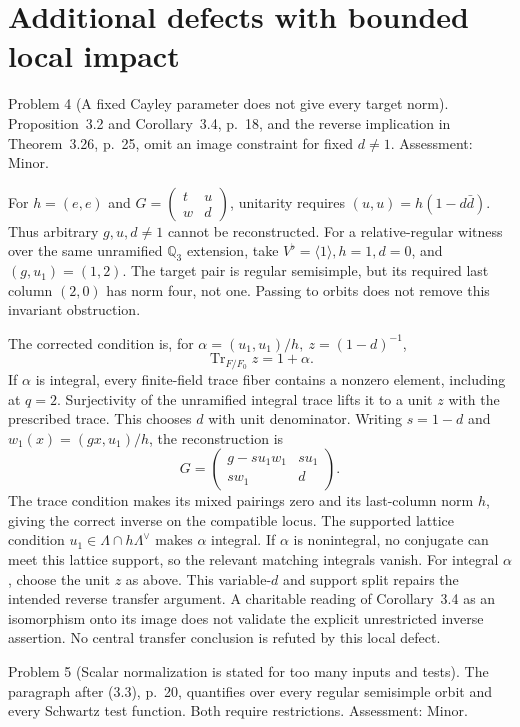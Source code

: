 \documentclass[10pt]{article}
\begin{document}
\section*{Additional defects with bounded local impact}
Problem 4 (A fixed Cayley parameter does not give every target norm).  Proposition 3.2 and Corollary 3.4, p. 18, and the reverse implication in Theorem 3.26, p. 25, omit an image constraint for fixed \(d\ne1\). Assessment: Minor.\par
For \(h=(e,e)\) and \(G=\left(\begin{smallmatrix}t&u\\w&d\end{smallmatrix}\right)\), unitarity requires \((u,u)=h(1-d\bar d)\). Thus arbitrary \(g,u,d\ne1\) cannot be reconstructed. For a relative-regular witness over the same unramified \(\mathbb Q_3\) extension, take \(V^\flat=\langle1\rangle,h=1,d=0\), and \((g,u_1)=(1,2)\). The target pair is regular semisimple, but its required last column \((2,0)\) has norm four, not one. Passing to orbits does not remove this invariant obstruction.\par
The corrected condition is, for \(\alpha=(u_1,u_1)/h,\ z=(1-d)^{-1}\), \[\operatorname{Tr}_{F/F_0}z=1+\alpha.\] If \(\alpha\) is integral, every finite-field trace fiber contains a nonzero element, including at \(q=2\). Surjectivity of the unramified integral trace lifts it to a unit \(z\) with the prescribed trace. This chooses \(d\) with unit denominator. Writing \(s=1-d\) and \(w_1(x)=(gx,u_1)/h\), the reconstruction is \[G=\begin{pmatrix}g-su_1w_1&su_1\\sw_1&d\end{pmatrix}.\] The trace condition makes its mixed pairings zero and its last-column norm \(h\), giving the correct inverse on the compatible locus. The supported lattice condition \(u_1\in\Lambda\cap h\Lambda^\vee\) makes \(\alpha\) integral. If \(\alpha\) is nonintegral, no conjugate can meet this lattice support, so the relevant matching integrals vanish. For integral \(\alpha\), choose the unit \(z\) as above. This variable-\(d\) and support split repairs the intended reverse transfer argument. A charitable reading of Corollary 3.4 as an isomorphism onto its image does not validate the explicit unrestricted inverse assertion. No central transfer conclusion is refuted by this local defect.\par
Problem 5 (Scalar normalization is stated for too many inputs and tests).  The paragraph after (3.3), p. 20, quantifies over every regular semisimple orbit and every Schwartz test function. Both require restrictions. Assessment: Minor.\par
\end{document}
